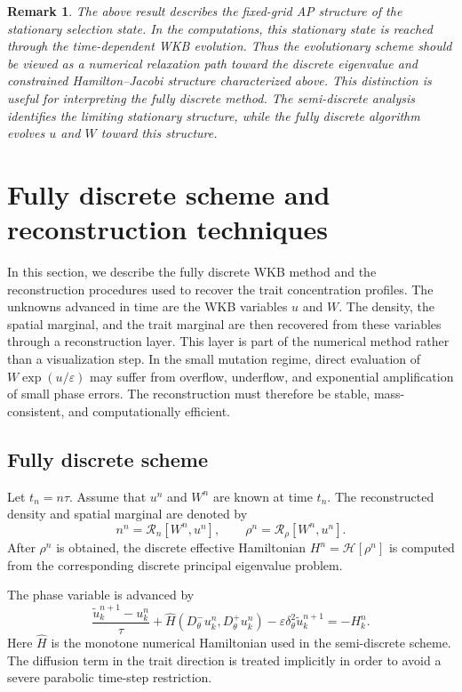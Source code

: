 \documentclass[11pt]{article}
\newtheorem{remark}{Remark}[section]
\begin{document}
\begin{remark}
The above result describes the fixed-grid AP structure of the stationary
selection state.  In the computations, this stationary state is reached through
the time-dependent WKB evolution.  Thus the evolutionary scheme should be viewed
as a numerical relaxation path toward the discrete eigenvalue and constrained
Hamilton--Jacobi structure characterized above.
This distinction is useful for interpreting the fully discrete method.  The
semi-discrete analysis identifies the limiting stationary structure, while the
fully discrete algorithm evolves \(u\) and \(W\) toward this structure. 
\end{remark}








\section{Fully discrete scheme and reconstruction techniques}
\label{subsec:fully_discrete_reconstruction}

In this section, we describe the fully discrete WKB method and the
reconstruction procedures used to recover the trait concentration profiles.  
The unknowns advanced in time are the WKB variables \(u\) and \(W\).  
The density, the spatial marginal, and the trait marginal are then recovered from these
variables through a reconstruction layer. 
 This layer is part of the numerical
method rather than a visualization step.  In the small mutation regime, direct
evaluation of \(W\exp(u/\varepsilon)\) may suffer from overflow, underflow, and
exponential amplification of small phase errors.  The reconstruction must
therefore be stable, mass-consistent, and computationally efficient.

\subsection{Fully discrete scheme}

Let \(t_n=n\tau\).  Assume that \(u^n\) and \(W^n\) are known at time \(t_n\).
The reconstructed density and spatial marginal are denoted by
\[
    n^n={\mathcal R}_n[W^n,u^n],
    \qquad
    \rho^n={\mathcal R}_\rho[W^n,u^n].
\]
After \(\rho^n\) is obtained, the discrete effective Hamiltonian
\(H^n=\mathcal H[\rho^n]\) is computed from the corresponding discrete
principal eigenvalue problem.

The phase variable is advanced by
\begin{equation}
    \frac{\widetilde u_k^{n+1}-u_k^n}{\tau}
    +
    \widehat H(D_\theta^-u_k^n,D_\theta^+u_k^n)
    -
    \varepsilon\delta_\theta^2\widetilde u_k^{n+1}
    =
    -H_k^n .
    \label{eq:fully-discrete-u}
\end{equation}
Here \(\widehat H\) is the monotone numerical Hamiltonian used in the
semi-discrete scheme.  The diffusion term in the trait direction is treated
implicitly in order to avoid a severe parabolic time-step restriction.
\end{document}
